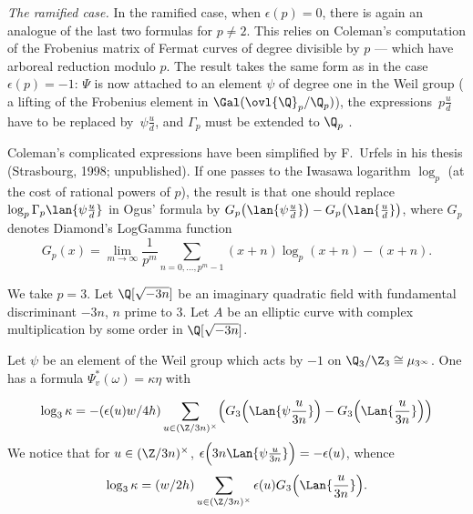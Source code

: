  \begin{para} {\itshape The ramified case.}\label{para-ramif} In the
  ramified case, \ie when
  $\epsilon (p)=0$, there is again an analogue of the
  last two formulas for
  $p\neq 2$. This relies on
  Coleman's computation of the Frobenius matrix of Fermat curves of degree
  divisible by $p$ --- which have arboreal reduction modulo $p$. The result
  takes the same form as in the case $\epsilon (p)=-1$: $\Psi$ is now
  attached to an element $\psi$ of degree one in the Weil group (\ie
  a lifting of the Frobenius element in
  $\Gal({\ovl{\Q}}_p/{\Q}_p)$), the expressions $\,{p\frac{u}{d}}\,$ have
  to be replaced by $\,{\psi\frac{u}{d}}$, and $\Gamma_p$ must be extended to 
  ${\Q}_p$ 
  \cite[6.5]{coleman90:_froben_fermat}. 
  
  Coleman's complicated expressions have been simplified by F.~Urfels in
  his thesis (Strasbourg, 1998; unpublished). If one passes to the
  Iwasawa logarithm $\log_p$ 
  (at the cost of rational powers of $p$), the result is that one should
  replace $\log_p \Gamma_p \lan{\psi\frac{u}{d}}$ in Ogus' formula by
  $G_p\bigl(\lan{\psi\frac{u}{d}}\bigr)-G_p\bigl(\lan{\frac{u}{d}}\bigr)$, 
  where $G_p$ denotes Diamond's LogGamma function
  \begin{equation*}
   G_p(x)= \lim_{m\to \infty}\frac{1}{p^m}\sum_{n=0,\ldots, p^m-1}
    (x+n)\log_p(x+n) -(x+n) .
  \end{equation*}
 
 We take $p=3$. Let $\Q[\sqrt{-3n}]$ be an
 imaginary quadratic field with fundamental discriminant $-3n$, $n$
 prime to $3$. Let  $A$  be an elliptic curve with 
complex multiplication by some order in $\Q[\sqrt{-3n}]$.

Let $\psi$ be an element of the Weil group which acts by $-1$ on
$\Q_3/\Z_3\cong \mu_{3^\infty}$. One has a formula $\Psi_v^{\ast}
(\omega) = \kappa\eta$ with

\begin{equation*}
 \log_3 \kappa =-(\epsilon(u)w/4h)\sum_{u\in ({\Z}/3n)^{\times}}
 \Bigl(G_3\Bigl(\Lan{\psi\frac{u}{3n}}\Bigr) - 
 G_3\Bigl(\Lan{\frac{u}{3n}}\Bigr)\Bigr)
\end{equation*}
 We notice that for $u\in
 ({\Z}/3n)^{\times}$,
 $\epsilon\Bigl(3n\Lan{\psi\frac{u}{3n}}\Bigr)=-\epsilon (u)$, 
 whence
\begin{equation*}
  \log_3 \kappa = (w/2h) \sum_{u\in ({\Z}/3n)^{\times}}
 \epsilon(u)G_3\Bigl(\Lan{\frac{u}{3n}}\Bigr).
\end{equation*}


\end{para}
